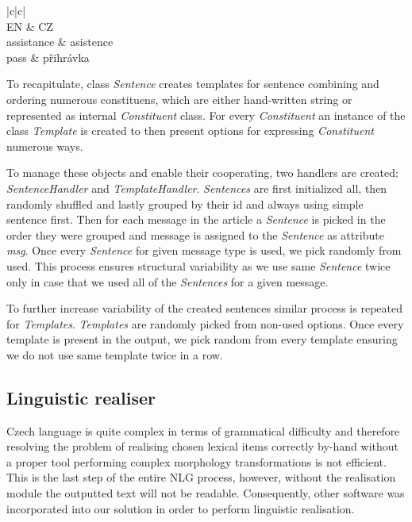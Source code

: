 \begin{center}
	\begin{tabular}{ |c|c| }
		\hline
		 \\ \hline
		 EN & CZ \\ \hline
		assistance  & asistence\\
		pass & přihrávka \\
		\hline
	\end{tabular}
\end{center}

To recapitulate, class \textit{Sentence} creates templates for sentence combining and ordering numerous constituens, which are either hand-written string or represented as internal \textit{Constituent} class. For every \textit{Constituent} an instance of the class \textit{Template} is created to then present options for expressing \textit{Constituent} numerous ways.

To manage these objects and enable their cooperating, two handlers are created: \textit{SentenceHandler} and \textit{TemplateHandler}. \textit{Sentences} are first initialized all, then randomly shuffled and lastly grouped by their id and always using simple sentence first. Then for each message in the article a \textit{Sentence} is picked in the order they were grouped and message is assigned to the \textit{Sentence} as attribute \textit{msg}. Once every \textit{Sentence} for given message type is used, we pick randomly from used. This process ensures structural variability as we use same \textit{Sentence} twice only in case that we used all of the \textit{Sentences} for a given message.

To further increase variability of the created sentences similar process is repeated for \textit{Templates}. \textit{Templates} are randomly picked from non-used options. Once every template is present in the output, we pick random from every template ensuring we do not use same template twice in a row.

\subsection{Linguistic realiser}
Czech language is quite complex in terms of grammatical difficulty and therefore resolving the problem of realising chosen lexical items correctly by-hand without a proper tool performing complex morphology transformations is not efficient. This is the last step of the entire NLG process, however, without the realisation module the outputted text will not be readable. Consequently, other software was incorporated into our solution in order to perform linguistic realisation.

